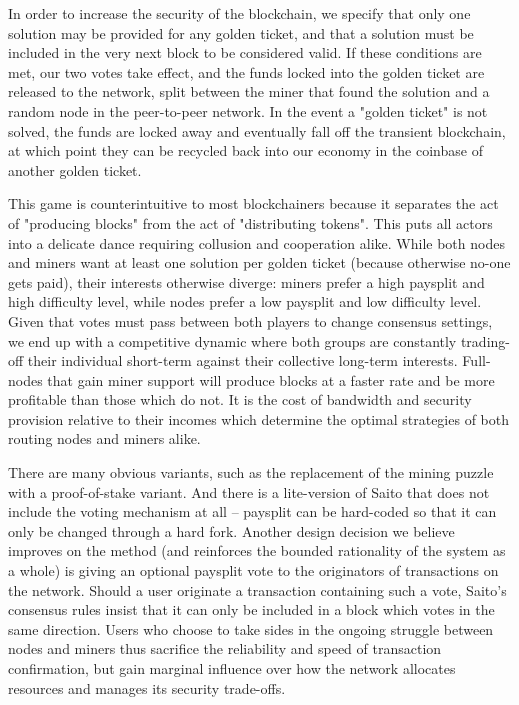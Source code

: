 \documentclass[11.5pt, oneside]{article}   	%
\begin{document}
\begin{multicols}{2}
In order to increase the security of the blockchain, we specify that only one solution may be provided for any golden ticket, and that a solution must be included in the very next block to be considered valid. If these conditions are met, our two votes take effect, and the funds locked into the golden ticket are released to the network, split between the miner that found the solution and a random node in the peer-to-peer network. In the event a "golden ticket" is not solved, the funds are locked away and eventually fall off the transient blockchain, at which point they can be recycled back into our economy in the coinbase of another golden ticket. 

This game is counterintuitive to most blockchainers because it separates the act of "producing blocks" from the act of "distributing tokens". This puts all actors into a delicate dance requiring collusion and cooperation alike. While both nodes and miners want at least one solution per golden ticket (because otherwise no-one gets paid), their interests otherwise diverge: miners prefer a high paysplit and high difficulty level, while nodes prefer a low paysplit and low difficulty level. Given that votes must pass between both players to change consensus settings, we end up with a competitive dynamic where both groups are constantly trading-off their individual short-term against their collective long-term interests. Full-nodes that gain miner support will produce blocks at a faster rate and be more profitable than those which do not. It is the cost of bandwidth and security provision relative to their incomes which determine the optimal strategies of both routing nodes and miners alike.

There are many obvious variants, such as the replacement of the mining puzzle with a proof-of-stake variant. And there is a lite-version of Saito that does not include the voting mechanism at all -- paysplit can be hard-coded so that it can only be changed through a hard fork. Another design decision we believe improves on the method (and reinforces the bounded rationality of the system as a whole) is giving an optional paysplit vote to the originators of transactions on the network. Should a user originate a transaction containing such a vote, Saito's consensus rules insist that it can only be included in a block which votes in the same direction. Users who choose to take sides in the ongoing struggle between nodes and miners thus sacrifice the reliability and speed of transaction confirmation, but gain marginal influence over how the network allocates resources and manages its security trade-offs.


\end{multicols}
\end{document}
